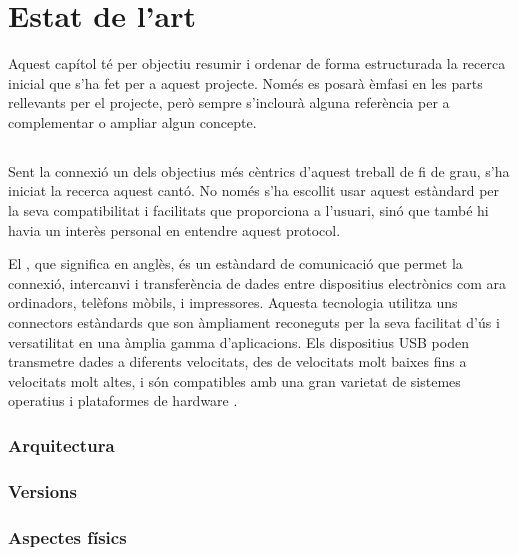 \chapter{Estat de l'art}
\label{cap:estat-de-l-art}

Aquest capítol té per objectiu resumir i ordenar de forma estructurada la
recerca inicial que s'ha fet per a aquest projecte. Només es posarà èmfasi en
les parts rellevants per el projecte, però sempre s'inclourà alguna referència
per a complementar o ampliar algun concepte.

\section{}

Sent la connexió  un dels objectius més cèntrics d'aquest treball de
fi de grau, s'ha iniciat la recerca aquest cantó. No només s'ha escollit usar
aquest estàndard per la seva compatibilitat
i facilitats que proporciona a l'usuari, sinó que també hi havia un interès
personal en entendre aquest protocol.

El , que significa  en anglès, és un
estàndard de comunicació que permet la connexió, intercanvi i transferència de
dades entre dispositius electrònics com ara ordinadors, telèfons mòbils, i
impressores. Aquesta tecnologia utilitza uns connectors estàndards que son
àmpliament reconeguts per la seva facilitat d'ús i versatilitat en una àmplia
gamma d'aplicacions. Els dispositius USB poden transmetre dades a diferents
velocitats, des de velocitats molt baixes fins a velocitats molt altes,
i són compatibles amb una gran varietat de sistemes operatius i plataformes
de hardware \cite{Axelson2015USB}.

\subsection{Arquitectura}

\subsection{Versions}

\subsection{Aspectes físics}


